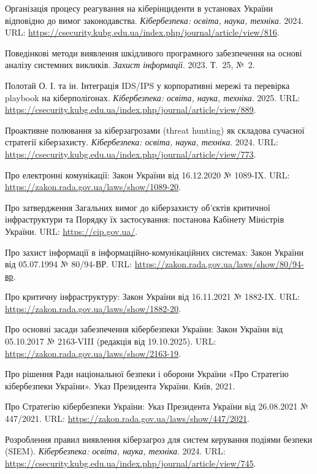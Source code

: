  Організація процесу реагування на кіберінциденти в установах України відповідно до вимог законодавства. \emph{Кібербезпека: освіта, наука, техніка}. 2024. URL: \url{https://csecurity.kubg.edu.ua/index.php/journal/article/view/816}.

 Поведінкові методи виявлення шкідливого програмного забезпечення на основі аналізу системних викликів. \emph{Захист інформації}. 2023. Т.~25, №~2.

 Полотай О. І. та ін. Інтеграція IDS/IPS у корпоративні мережі та перевірка playbook на кіберполігонах. \emph{Кібербезпека: освіта, наука, техніка}. 2025. URL: \url{https://csecurity.kubg.edu.ua/index.php/journal/article/view/889}.

 Проактивне полювання за кіберзагрозами (threat hunting) як складова сучасної стратегії кіберзахисту. \emph{Кібербезпека: освіта, наука, техніка}. 2024. URL: \url{https://csecurity.kubg.edu.ua/index.php/journal/article/view/773}.

 Про електронні комунікації: Закон України від 16.12.2020 № 1089-IX. URL: \url{https://zakon.rada.gov.ua/laws/show/1089-20}.

 Про затвердження Загальних вимог до кіберзахисту об'єктів критичної інфраструктури та Порядку їх застосування: постанова Кабінету Міністрів України. URL: \url{https://cip.gov.ua/}.

 Про захист інформації в інформаційно-комунікаційних системах: Закон України від 05.07.1994 № 80/94-ВР. URL: \url{https://zakon.rada.gov.ua/laws/show/80/94-вр}.

 Про критичну інфраструктуру: Закон України від 16.11.2021 № 1882-IX. URL: \url{https://zakon.rada.gov.ua/laws/show/1882-20}.

 Про основні засади забезпечення кібербезпеки України: Закон України від 05.10.2017 № 2163-VIII (редакція від 19.10.2025). URL: \url{https://zakon.rada.gov.ua/laws/show/2163-19}.

 Про рішення Ради національної безпеки і оборони України «Про Стратегію кібербезпеки України». Указ Президента України. Київ, 2021.

 Про Стратегію кібербезпеки України: Указ Президента України від 26.08.2021 № 447/2021. URL: \url{https://zakon.rada.gov.ua/laws/show/447/2021}.

 Розроблення правил виявлення кіберзагроз для систем керування подіями безпеки (SIEM). \emph{Кібербезпека: освіта, наука, техніка}. 2024. URL: \url{https://csecurity.kubg.edu.ua/index.php/journal/article/view/745}.

